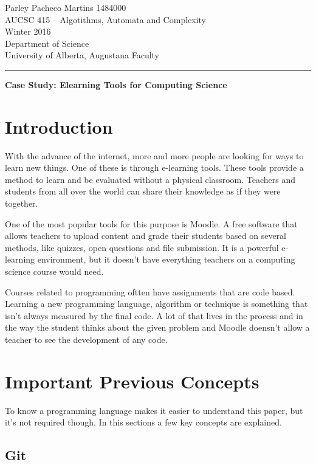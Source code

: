\documentclass[12pt]{article}
\begin{document}
\noindent
Parley Pacheco Martins 1484000\\
AUCSC 415 -- Algotithms, Automata and Complexity\\
Winter 2016\\
Department of Science\\
University of Alberta, Augustana Faculty

\vspace*{0.75\baselineskip}
\hrule
\vspace*{0.75\baselineskip}

\noindent
{\Large\bf Case Study: Elearning Tools for Computing Science}

\section{Introduction}

With the advance of the internet, more and more people are looking for ways to learn new things. One of these is through e-learning tools. These tools provide a method to learn and be evaluated without a physical classroom. Teachers and students from all over the world can share their knowledge as if they were together.

One of the most popular tools for this purpose is Moodle. A free software that allows teachers to upload content and grade their students based on several methods, like quizzes, open questions and file submission. It is a powerful e-learning environment, but it doesn't have everything teachers on a computing science course would need.

Courses related to programming oftten have assignments that are code based. Learning a new programming language, algorithm or technique is something that isn't always measured by the final code. A lot of that lives in the process and in the way the student thinks about the given problem and Moodle doensn't allow a teacher to see the development of any code.


\section{Important Previous Concepts}

To know a programming language makes it easier to understand this paper, but it's not required though. In this sections a few key concepts are explained.

\subsection{Git}
\end{document}
